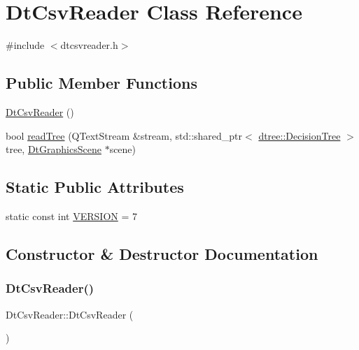 \hypertarget{class_dt_csv_reader}{}\section{Dt\+Csv\+Reader Class Reference}
\label{class_dt_csv_reader}


{\ttfamily \#include $<$dtcsvreader.\+h$>$}

\subsection*{Public Member Functions}
\begin{DoxyCompactItemize}
\item 
\mbox{\hyperlink{class_dt_csv_reader_a656d8c509ab72798f83d427fa8b5ab2b}{Dt\+Csv\+Reader}} ()
\item 
bool \mbox{\hyperlink{class_dt_csv_reader_a4588366de4199026256c0529a064c954}{read\+Tree}} (Q\+Text\+Stream \&stream, std\+::shared\+\_\+ptr$<$ \mbox{\hyperlink{classdtree_1_1_decision_tree}{dtree\+::\+Decision\+Tree}} $>$ tree, \mbox{\hyperlink{class_dt_graphics_scene}{Dt\+Graphics\+Scene}} $\ast$scene)
\end{DoxyCompactItemize}
\subsection*{Static Public Attributes}
\begin{DoxyCompactItemize}
\item 
static const int \mbox{\hyperlink{class_dt_csv_reader_a18249e168ab97de92944a067254a3eec}{V\+E\+R\+S\+I\+ON}} = 7
\end{DoxyCompactItemize}


\subsection{Constructor \& Destructor Documentation}
\mbox{\label{class_dt_csv_reader_a656d8c509ab72798f83d427fa8b5ab2b}} 
\subsubsection{\texorpdfstring{DtCsvReader()}{DtCsvReader()}}
{\footnotesize\ttfamily Dt\+Csv\+Reader\+::\+Dt\+Csv\+Reader (\begin{DoxyParamCaption}{ }\end{DoxyParamCaption})}



